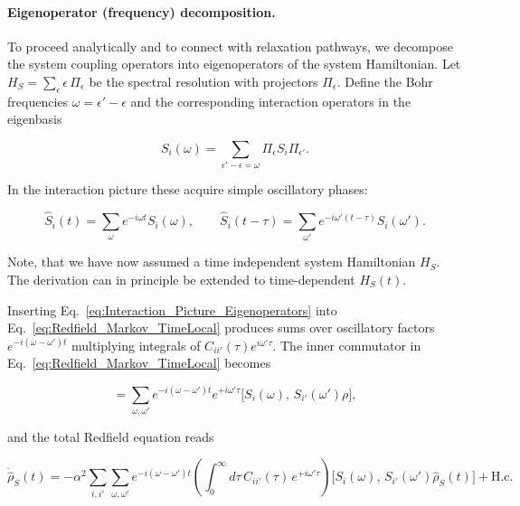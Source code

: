 \paragraph{Eigenoperator (frequency) decomposition.}

\noindent
To proceed analytically and to connect with relaxation pathways, we decompose the system coupling operators into eigenoperators of the system Hamiltonian. Let $H_S = \sum_{\epsilon} \epsilon \, \Pi_{\epsilon}$ be the spectral resolution with projectors $\Pi_{\epsilon}$. Define the Bohr frequencies $\omega = \epsilon' - \epsilon$ and the corresponding interaction operators in the eigenbasis

\begin{equation}
	S_i(\omega) = \sum_{\epsilon' - \epsilon = \omega} \Pi_{\epsilon} S_i \Pi_{\epsilon'}.
	\label{eq:Eigenoperator_Decomposition}
\end{equation}

\noindent
In the interaction picture these acquire simple oscillatory phases:

\begin{equation}
	\hat{S}_i(t) = \sum_{\omega} e^{-i \omega t} S_i(\omega), \qquad \hat{S}_i(t-\tau) = \sum_{\omega'} e^{-i \omega'(t-\tau)} S_i(\omega').
	\label{eq:Interaction_Picture_Eigenoperators}
\end{equation}

\noindent
Note, that we have now assumed a time independent system Hamiltonian $H_S$. The derivation can in principle be extended to time-dependent $H_S(t)$. 

\noindent
Inserting Eq.~\eqref{eq:Interaction_Picture_Eigenoperators} into Eq.~\eqref{eq:Redfield_Markov_TimeLocal} produces sums over oscillatory factors $e^{-i(\omega - \omega') t}$ multiplying integrals of $C_{ii'}(\tau) e^{i \omega' \tau}$. The inner commutator in Eq.~\eqref{eq:Redfield_Markov_TimeLocal} becomes

\begin{equation}
[\hat{S}_i(t),\, \hat{S}_{i'}(t-\tau)\rho]
= \sum_{\omega,\omega'} e^{-i(\omega - \omega')t} e^{+i \omega' \tau}
\big[ S_i(\omega),\, S_{i'}(\omega') \rho \big],
\label{eq:Inner_Commutator_Frequency_Decomposed}
\end{equation}

\noindent
and the total Redfield equation reads

\begin{equation}
	\dot{\hat{\rho}}_S(t) = -\alpha^2 \sum_{i,i'} \sum_{\omega,\omega'} e^{-i(\omega - \omega')t}
	\left( \int_0^{\infty} d\tau\, C_{ii'}(\tau)\, e^{+i \omega' \tau} \right)
	\big[ S_i(\omega),\, S_{i'}(\omega') \hat{\rho}_S(t) \big]
	+ \text{H.c.}
	\label{eq:Redfield_Frequency_Decomposed}
\end{equation}

